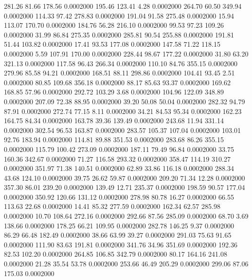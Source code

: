  281.26   81.66  178.56   0.0002000
 195.46  123.41    4.28   0.0002000
 264.70   60.50  349.94   0.0002000
 114.33   97.42  278.83   0.0002000
 191.04   91.58  275.48   0.0002000
  15.94  113.07  170.70   0.0002000
 184.76   56.28  216.10   0.0002000
  99.53   97.23  109.26   0.0002000
  31.99   86.84  275.35   0.0002000
 285.81   90.54  255.88   0.0002000
 191.81   51.44  103.82   0.0002000
  17.41   93.53  177.08   0.0002000
 147.58   71.22  118.15   0.0002000
   5.59  107.91  170.00   0.0002000
 228.44   98.67  177.22   0.0002000
  31.80   63.20  321.13   0.0002000
 117.58   96.43  266.34   0.0002000
 110.10   84.76  355.15   0.0002000
 279.96   85.58   94.21   0.0002000
 168.51   88.11  298.86   0.0002000
 104.41   93.45    2.51   0.0002000
  80.85  109.68  356.18   0.0002000
  88.17   85.63   93.37   0.0002000
 169.62  168.85   57.96   0.0002000
 292.72  103.29    3.68   0.0002000
 104.96  122.09  348.89   0.0002000
 207.09   72.38   88.95   0.0002000
  39.20   50.08   50.04   0.0002000
 282.32   94.79   87.91   0.0002000
 272.74   77.15    8.11   0.0002000
  34.21   84.53   95.34   0.0002000
 162.23  164.75   84.34   0.0002000
 163.78   39.36  139.49   0.0002000
 243.68   11.94  331.14   0.0002000
 302.54   96.53  163.87   0.0002000
 283.57  105.37  107.04   0.0002000
 103.01   92.76  183.94   0.0002000
 114.81   89.88  351.53   0.0002000
 283.68   86.26  355.15   0.0002000
 115.79  100.42  273.09   0.0002000
 187.11   79.49   96.84   0.0002000
  33.75  160.36  342.67   0.0002000
  71.27  116.58  293.32   0.0002000
 358.47  114.19  310.27   0.0002000
 351.97   71.38  140.51   0.0002000
  62.89   33.86  116.18   0.0002000
 288.34   43.68  124.10   0.0002000
  39.75   26.62   59.87   0.0002000
 209.20   71.34   12.28   0.0002000
 357.30   86.01  239.20   0.0002000
 139.49   12.71  235.37   0.0002000
 198.59   90.57  177.04   0.0002000
 350.92  120.66  131.12   0.0002000
 278.98   80.78   16.27   0.0002000
  66.55  113.63   22.68   0.0002000
  14.41   85.32  277.59   0.0002000
 162.34   62.57  285.98   0.0002000
  10.70  108.64  272.16   0.0002000
 292.66   87.56  285.09   0.0002000
  68.70    3.69  138.66   0.0002000
 178.25   66.21  109.95   0.0002000
 282.78  146.25    9.37   0.0002000
  86.29   66.48  182.49   0.0002000
  38.66   63.99   39.27   0.0002000
 291.03   75.63   91.65   0.0002000
 111.90   83.63  191.81   0.0002000
 341.76   34.96  351.69   0.0002000
 192.36   82.53  102.20   0.0002000
 264.85  106.85  342.79   0.0002000
  80.17  164.16  241.08   0.0002000
  21.28   35.54   53.78   0.0002000
 253.66   46.49  205.29   0.0002000
 299.06   87.06  175.03   0.0002000
